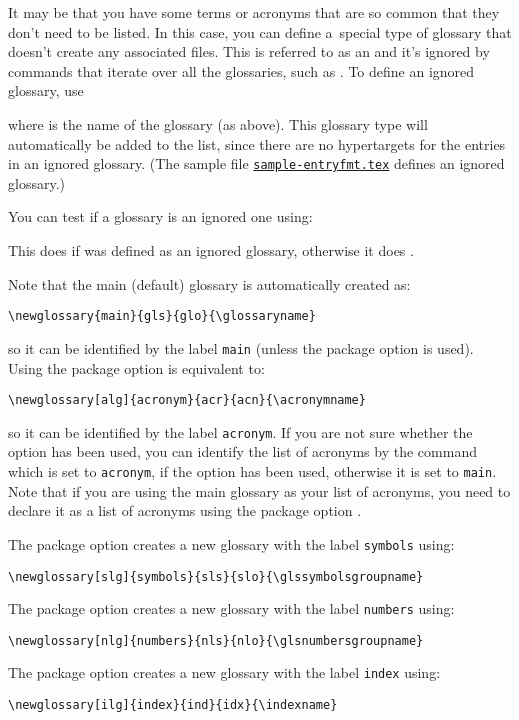 \documentclass[report,inlinetitle]{nlctdoc}
\newcounter{sample}
\newcommand*{\samplefile}[2][sample]{%
  \hyperref[ex:#1#2]{\texttt{#1#2.tex}}}
\begin{document}
It may be that you have some terms or acronyms that are so common
that they don't need to be listed. In this case, you can define 
a~special type of glossary that doesn't create any associated files.
This is referred to as an  and it's ignored by
commands that iterate over all the glossaries, such as
. To define an ignored glossary, use
\begin{definition}[\DescribeMacro\newignoredglossary]
\end{definition}
where  is the name of the glossary (as above). This
glossary type will automatically be added to the
 list, since there are no hypertargets for
the entries in an ignored glossary.
(The sample file \samplefile{-entryfmt} defines an ignored glossary.)

You can test if a glossary is an ignored one using:
\begin{definition}[\DescribeMacro\ifignoredglossary]
\end{definition}
This does  if  was defined as an ignored
glossary, otherwise it does .

Note that the main (default) glossary is automatically created as:
\begin{verbatim}
\newglossary{main}{gls}{glo}{\glossaryname}
\end{verbatim}
so it can be identified by the label \texttt{main} (unless the
 package option is used). Using the
 package option is equivalent to:
\begin{verbatim}
\newglossary[alg]{acronym}{acr}{acn}{\acronymname}
\end{verbatim}
so it can be identified by the label \texttt{acronym}. If you are
not sure whether the  option has been used, you
can identify the list of acronyms by the command 
\DescribeMacro{\acronymtype} which is set to
\texttt{acronym}, if the  option has been used,
otherwise it is set to \texttt{main}. Note that if you are using
the main glossary as your list of acronyms, you need to declare
it as a list of acronyms using the package option 
.

The  package option creates a new glossary with the
label \texttt{symbols} using:
\begin{verbatim}
\newglossary[slg]{symbols}{sls}{slo}{\glssymbolsgroupname}
\end{verbatim}
The  package option creates a new glossary with
the label \texttt{numbers} using:
\begin{verbatim}
\newglossary[nlg]{numbers}{nls}{nlo}{\glsnumbersgroupname}
\end{verbatim}
The  package option creates a new glossary with
the label \texttt{index} using:
\begin{verbatim}
\newglossary[ilg]{index}{ind}{idx}{\indexname}
\end{verbatim}
\end{document}

